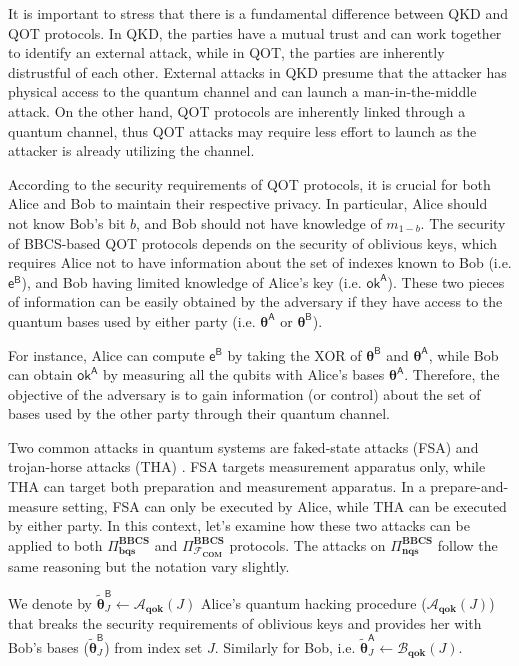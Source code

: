 It is important to stress that there is a fundamental difference between QKD and QOT protocols. In QKD, the parties have a mutual trust and can work together to identify an external attack, while in QOT, the parties are inherently distrustful of each other. External attacks in QKD presume that the attacker has physical access to the quantum channel and can launch a man-in-the-middle attack. On the other hand, QOT protocols are inherently linked through a quantum channel, thus QOT attacks may require less effort to launch as the attacker is already utilizing the channel.




According to the security requirements of QOT protocols, it is crucial for both Alice and Bob to maintain their respective privacy. In particular, Alice should not know Bob's bit $b$, and Bob should not have knowledge of $m_{1-b}$. The security of BBCS-based QOT protocols depends on the security of oblivious keys, which requires Alice not to have information about the set of indexes known to Bob (i.e. $\mathsf{e}^\mathsf{B}$), and Bob having limited knowledge of Alice's key (i.e. $\mathsf{ok}^\mathsf{A}$). These two pieces of information can be easily obtained by the adversary if they have access to the quantum bases used by either party (i.e. $\bm{\theta}^{\mathsf{A}}$ or $\bm{\theta}^{\mathsf{B}}$).

For instance, Alice can compute $\mathsf{e}^\mathsf{B}$ by taking the XOR of $\bm{\theta}^{\mathsf{B}}$ and $\bm{\theta}^{\mathsf{A}}$, while Bob can obtain $\mathsf{ok}^\mathsf{A}$ by measuring all the qubits with Alice's bases $\bm{\theta}^{\mathsf{A}}$. Therefore, the objective of the adversary is to gain information (or control) about the set of bases used by the other party through their quantum channel.

Two common attacks in quantum systems are faked-state attacks (FSA) and trojan-horse attacks (THA) \cite{MH05, GFKZR06}. FSA targets measurement apparatus only, while THA can target both preparation and measurement apparatus. In a prepare-and-measure setting, FSA can only be executed by Alice, while THA can be executed by either party. In this context, let's examine how these two attacks can be applied to both $\Pi^{\textbf{BBCS}}_{\textbf{bqs}}$ and $\Pi^{\textbf{BBCS}}_{\mathcal{F}_\textbf{COM}}$ protocols. The attacks on $\Pi^{\textbf{BBCS}}_{\textbf{nqs}}$ follow the same reasoning but the notation vary slightly. 

We denote by $\tilde{\bm{\theta}}^{\mathsf{B}}_J \leftarrow \mathcal{A}_{\textbf{qok}}(J)$ Alice's quantum hacking procedure ($\mathcal{A}_{\textbf{qok}}(J)$) that breaks the security requirements of oblivious keys and provides her with Bob's bases ($\tilde{\bm{\theta}}^{\mathsf{B}}_J$) from index set $J$. Similarly for Bob, i.e. $\tilde{\bm{\theta}}^{\mathsf{A}}_J \leftarrow \mathcal{B}_{\textbf{qok}}(J)$.

